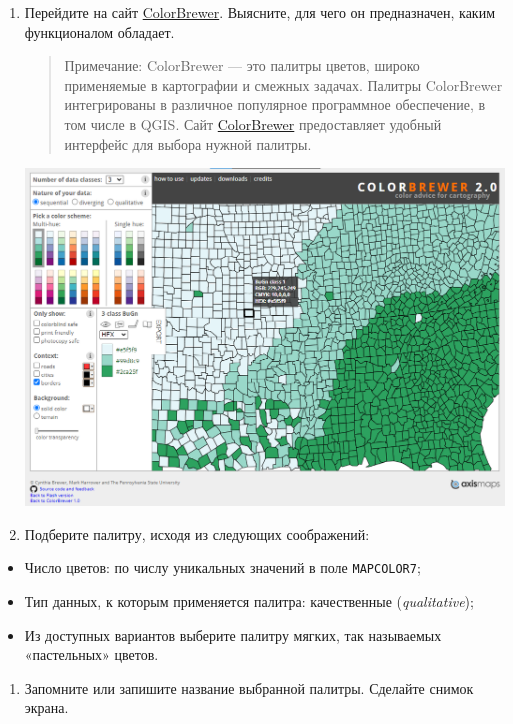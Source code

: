 \documentclass[
  12pt,
]{book}
\providecommand{\tightlist}{%
  \setlength{\itemsep}{0pt}\setlength{\parskip}{0pt}}
\begin{document}
\begin{enumerate}
\def\labelenumi{\arabic{enumi}.}
\setcounter{enumi}{1}
\item
  Перейдите на сайт \href{https://colorbrewer2.org/}{ColorBrewer}. Выясните, для чего он предназначен, каким функционалом обладает.

  \begin{quote}
  Примечание: ColorBrewer --- это палитры цветов, широко применяемые в картографии и смежных задачах. Палитры ColorBrewer интегрированы в различное популярное программное обеспечение, в том числе в QGIS. Сайт \href{https://colorbrewer2.org/}{ColorBrewer} предоставляет удобный интерфейс для выбора нужной палитры.
  \end{quote}

  \includegraphics{images/Ex01_WorldMap/colorbrewer.png}
\item
  Подберите палитру, исходя из следующих соображений:
\end{enumerate}

\begin{itemize}
\tightlist
\item
  Число цветов: по числу уникальных значений в поле \texttt{MAPCOLOR7};
\item
  Тип данных, к которым применяется палитра: качественные (\emph{qualitative});
\item
  Из доступных вариантов выберите палитру мягких, так называемых «пастельных» цветов.
\end{itemize}

\begin{enumerate}
\def\labelenumi{\arabic{enumi}.}
\setcounter{enumi}{3}
\tightlist
\item
  Запомните или запишите название выбранной палитры. Сделайте снимок экрана.
\end{enumerate}
\end{document}
